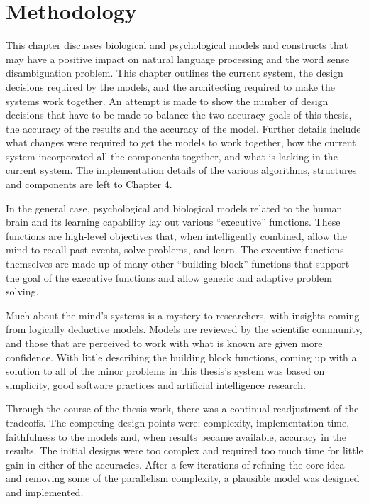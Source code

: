 \chapter{Methodology}

This chapter discusses biological and psychological models and constructs that
may have a positive impact on natural language processing and the word sense
disambiguation problem.  This chapter outlines the current system, the design
decisions required by the models, and the architecting required to make the
systems work together.  An attempt is made to show the number of design
decisions that have to be made to balance the two accuracy goals of this thesis,
the accuracy of the results and the accuracy of the model. Further details
include what changes were required to get the models to work together, how the
current system incorporated all the components together, and what is lacking in
the current system.  The implementation details of the various algorithms,
structures and components are left to Chapter 4.

In the general case, psychological and biological models related to the human
brain and its learning capability lay out various ``executive'' functions.
These functions are high-level objectives that, when intelligently combined, allow
the mind to recall past events, solve problems, and learn. The executive
functions themselves are made up of many other ``building block'' functions that
support the goal of the executive functions and allow generic and adaptive
problem solving.

Much about the mind's systems is a mystery to researchers, with insights coming
from logically deductive models.  Models are reviewed by the scientific
community, and those that are perceived to work with what is known are given
more confidence.  With little describing the building block functions, coming up
with a solution to all of the minor problems in this thesis's system was based on
simplicity, good software practices and artificial intelligence research.

Through the course of the thesis work, there was a continual readjustment of the
tradeoffs. The competing design points were: complexity, implementation time,
faithfulness to the models and, when results became available, accuracy in the
results.  The initial designs were too complex and required too much time for
little gain in either of the accuracies.  After a few iterations of refining the
core idea and removing some of the parallelism complexity, a plausible model was
designed and implemented.

